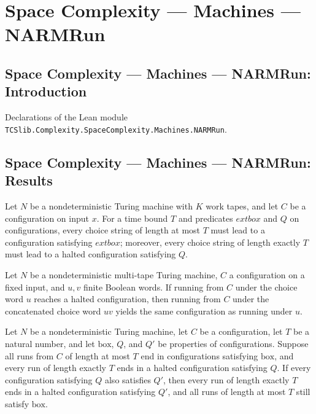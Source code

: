 \section{Space Complexity --- Machines --- NARMRun}
\subsection*{Space Complexity --- Machines --- NARMRun: Introduction}

Declarations of the Lean module \texttt{TCSlib.Complexity.SpaceComplexity.Machines.NARMRun}.

\subsection*{Space Complexity --- Machines --- NARMRun: Results}

\begin{definition}
\label{Complexity.LogProg.NGood}
\leanok
{}
Let $N$ be a nondeterministic Turing machine with $K$ work tapes, and let $C$ be a
configuration on input $x$. For a time bound $T$ and predicates $	ext{box}$ and $Q$ on
configurations, every choice string of length at most $T$ must lead to a configuration
satisfying $	ext{box}$; moreover, every choice string of length exactly $T$ must lead to
a halted configuration satisfying $Q$.
\end{definition}

\begin{lemma}
\label{Complexity.LogProg.runWith_append_of_halt}
\leanok
{}
Let $N$ be a nondeterministic multi-tape Turing machine, $C$ a configuration on a fixed
input, and $u,v$ finite Boolean words. If running from $C$ under the choice word $u$
reaches a halted configuration, then running from $C$ under the concatenated choice word
$uv$ yields the same configuration as running under $u$.
\end{lemma}

\begin{lemma}
\label{Complexity.LogProg.NGood.imp}
\leanok
{}
Let $N$ be a nondeterministic Turing machine, let $C$ be a configuration, let $T$ be a
natural number, and let $\mathrm{box}$, $Q$, and $Q'$ be properties of configurations.
Suppose all runs from $C$ of length at most $T$ end in configurations satisfying
$\mathrm{box}$, and every run of length exactly $T$ ends in a halted configuration
satisfying $Q$. If every configuration satisfying $Q$ also satisfies $Q'$, then every
run of length exactly $T$ ends in a halted configuration satisfying $Q'$, and all runs
of length at most $T$ still satisfy $\mathrm{box}$.
\end{lemma}


